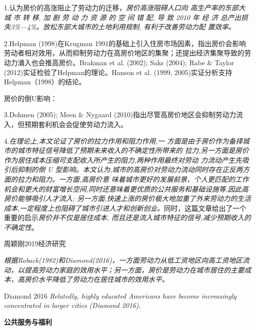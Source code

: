 \documentclass[a4paper,12pt,oneside]{book} %
\begin{document}
1.\cite{WangLiLiTuDiGongGeiFangJieYuLaoDongLiKongJianPeiZhiXiaoLu2023}认为房价的高涨阻止了劳动力的迁移，\textit{房价高涨阻碍人口向 高生产率的东部大 城 市 转 移, 加 剧 劳 动 力 资 源 的 空 间 错 配, 导 致 2010 年 经 济 总产出损失3\%—4\%。放松东部大城市的土地利用规制, 有利于改善劳动力配 置效率。}

2.Helpman (1998)在Krugman 1991的基础上引入住房市场因素，指出房价会影响劳动者相对效用，从而抑制劳动力在高房价地区的集聚；还提出经济集聚导致的劳动力涌入也会推高房价。Brakman et al. (2002); Saks (2004); Rabe \& Taylor (2012)实证检验了Helpman的理论。Hanson et al. (1999, 2005)实证分析支持Helpman（1998）的结论。

房价的倒U影响：

3.Dohmen (2005); Meen \& Nygaard (2010)指出尽管高房价地区会抑制劳动力流入，但预期套利机会会促使劳动力流入。

4.\cite{ZhangLiFangJieRuHeYingXiangLaoDongLiLiuDong2017}\textit{在理论上,本文论证了房价的拉力作用和阻力作用,一 方面是由于房价作为备择城市的城市特征信号降低了预期未来收入的不确定性所带来的 拉力,另一方面是房价作为居住成本压缩可支配收入所产生的阻力,两种作用最终对劳动 力流动产生先吸引后抑制的倒 U 型影响。本文认为,城市的高房价对劳动力流动同时存在正反两方面的拉力和阻力。一方面,高房价意  味着城市更好的发展前景、个人更匹配的工作机会和更大的财富增长空间,同时还意味着更优质的公共服务和基础设施等,因此高房价能够吸引人才流入; 另一方面,快速上涨的房价极大地加重了外来劳动力的生活成本,一定程度上也阻碍了城市引进人才和创新创业。}同时，这篇文章给出了一个重要的启示\textit{房价并不仅是居住成本, 而且还是流入城市特征的信号,减少预期收入的不确定性}。

周颖刚2019经济研究\cite{ZhouYingGangGaoFangJieJiChuLiaoShuiJiYuZhongGuoLiuDongRenKouDeWeiGuanShiJiao2019}

\textit{根据Roback(1982)和Diamond(2016)，一方面劳动力从低工资地区向高工资地区流动，以提高劳动力家庭的效用水平；另一方面，房价是劳动力在城市居住的主要成本，高房价水平降低了劳动力在居住城市的效用水平。}

Diamond 2016\cite{diamondDeterminantsWelfareImplications2016} \textit{Relatedly, highly educated Americans have become increasingly concentrated in larger cities (Diamond 2016).}
















\textbf{公共服务与福利}
\end{document}
